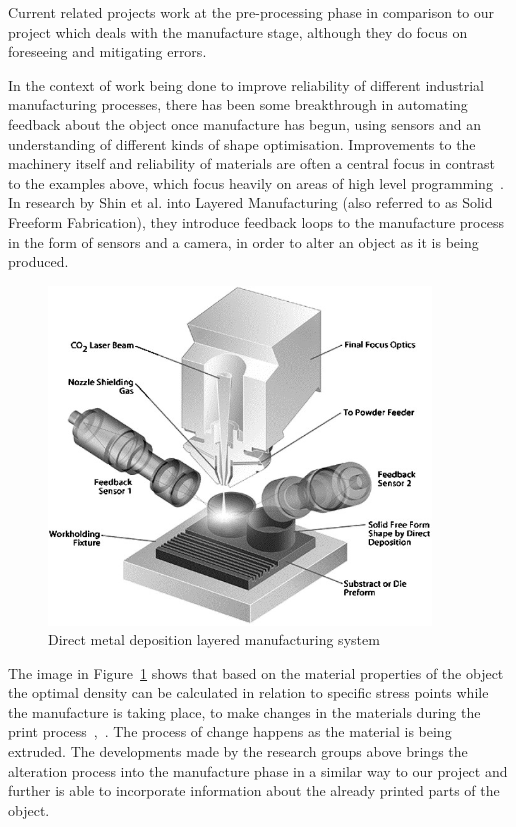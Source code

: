 \documentclass[pdftex, 11pt]{report} %
\begin{document}
Current related projects work at the pre-processing phase in comparison to our project which deals with the manufacture stage, although they do focus on foreseeing and mitigating errors. 

In the context of work being done to improve reliability of different industrial manufacturing processes, there has been some breakthrough in automating feedback about the object once manufacture has begun, using sensors and an understanding of different kinds of shape optimisation. Improvements to the machinery itself and reliability of materials are often a central focus in contrast to the examples above, which focus heavily on areas of high level programming~\cite{Tang2004}. In research by Shin et al. into Layered Manufacturing (also referred to as Solid Freeform Fabrication), they introduce feedback loops to the manufacture process in the form of sensors and a camera, in order to alter an object as it is being produced.

\begin{figure}[H]
  \centering
  \includegraphics[width=4in]{shin.jpg}
  \caption{Direct metal deposition layered manufacturing system~\cite{Shin2003}}
  \label{figure:Shin}
\end{figure}

The image in Figure~\ref{figure:Shin} shows that based on the material properties of the object the optimal density can be calculated in relation to specific stress points while the manufacture is taking place, to make changes in the materials during the print process~\cite{Shin2003},~\cite{Vaezi2013a}. The process of change happens as the material is being extruded. The developments made by the research groups above brings the alteration process into the manufacture phase in a similar way to our project and further is able to incorporate information about the already printed parts of the object.  
\end{document}
